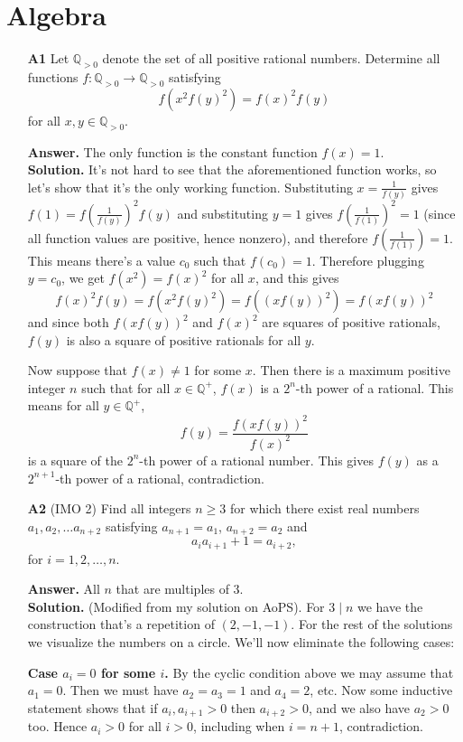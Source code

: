 \documentclass[11pt,a4paper]{article}
\begin{document}
\section*{Algebra}
\begin{enumerate}
	\item [\textbf{A1}] Let $\mathbb{Q}_{>0}$ denote the set of all positive rational numbers. Determine all functions $f:\mathbb{Q}_{>0}\to \mathbb{Q}_{>0}$ satisfying $$f(x^2f(y)^2)=f(x)^2f(y)$$for all $x,y\in\mathbb{Q}_{>0}$. 
	
	\textbf{Answer.} The only function is the constant function $f(x)=1$. \\
	\textbf{Solution.} It's not hard to see that the aforementioned function works, so let's show that it's the only working function. 
	Substituting $x=\frac{1}{f(y)}$ gives $f(1)=f(\frac{1}{f(y)})^2f(y)$ and substituting $y=1$ gives $f(\frac{1}{f(1)})^2=1$ (since all function values are positive, hence nonzero), and therefore $f(\frac{1}{f(1)})=1$. 
	This means there's a value $c_0$ such that $f(c_0)=1$. Therefore plugging $y=c_0$, we get $f(x^2)=f(x)^2$ for all $x$, and this gives 
	\[
	f(x)^2f(y)=f(x^2f(y)^2)=f((xf(y))^2)=f(xf(y))^2
	\]
	and since both $f(xf(y))^2$ and $f(x)^2$ are squares of positive rationals, $f(y)$ is also a square of positive rationals for all $y$. 
	
	Now suppose that $f(x)\neq 1$ for some $x$. Then there is a maximum positive integer $n$ such that for all $x\in\mathbb{Q}^+$, $f(x)$ is a $2^n$-th power of a rational. 
	This means for all $y\in\mathbb{Q}^+$, 
	\[
	f(y)=\frac{f(xf(y))^2}{f(x)^2}
	\]
	is a square of the $2^n$-th power of a rational number. This gives $f(y)$ as a $2^{n+1}$-th power of a rational, contradiction. 
	
	\item [\textbf{A2}] (IMO 2) Find all integers $n \geq 3$ for which there exist real numbers $a_1, a_2, \dots a_{n + 2}$ satisfying $a_{n + 1} = a_1$, $a_{n + 2} = a_2$ and
	$$a_ia_{i + 1} + 1 = a_{i + 2},$$for $i = 1, 2, \dots, n$.
	
	\textbf{Answer.} All $n$ that are multiples of 3. \\
	\textbf{Solution.} (Modified from my solution on AoPS). 
	For $3\mid n$ we have the construction that's a repetition of $(2, -1, -1)$. 
	For the rest of the solutions we visualize the numbers on a circle. 
	We'll now eliminate the following cases: 
	
	\textbf{Case $a_i=0$ for some $i$.} By the cyclic condition above we may assume that $a_1=0$. 
	Then we must have $a_2=a_3=1$ and $a_4=2$, etc. Now some inductive statement shows that if $a_i, a_{i+1}>0$ then $a_{i+2}>0$, and we also have $a_2>0$ too. Hence $a_i>0$ for all $i>0$, including when $i=n+1$, contradiction.


\end{enumerate}
\end{document}
